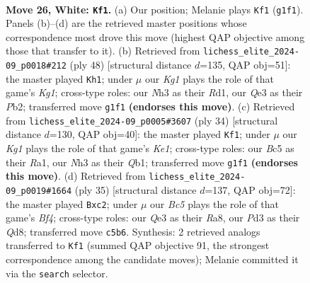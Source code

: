 \documentclass[11pt]{article}
\begin{document}
\clearpage

\begin{figure}[p]\centering
\begin{subfigure}{0.46\textwidth}\centering
\resizebox{\linewidth}{!}{%
\newchessgame
\chessboard[
  setfen={2bqn2r/4bpk1/p5p1/n1BBp2p/P3P3/N2PQ2N/1rP1RPPP/R5K1 w - - 4 26},
  showmover=false,
  pgfstyle=straightmove, color=movearrow, markmove={g1-f1}
]}
\caption{}
\end{subfigure}\hfill
\begin{subfigure}{0.46\textwidth}\centering
\resizebox{\linewidth}{!}{%
\newchessgame
\chessboard[
  setfen={2rq2k1/1p2bpp1/4p1nr/pb1pP2p/7P/P1BP1NQR/1P2NPP1/3R2K1 w - - 0 25},
  showmover=false,
  pgfstyle=straightmove, color=movearrow, markmove={g1-h1}
]}
\caption{}
\end{subfigure}
\\[4pt]
\begin{subfigure}{0.46\textwidth}\centering
\resizebox{\linewidth}{!}{%
\newchessgame
\chessboard[
  setfen={2rqkb2/1b1n1p1p/p3p3/P4p2/1ppP4/4PNB1/1P2BPrP/RQ2K2R w KQ - 0 18},
  showmover=false,
  pgfstyle=straightmove, color=movearrow, markmove={e1-f1}
]}
\caption{}
\end{subfigure}\hfill
\begin{subfigure}{0.46\textwidth}\centering
\resizebox{\linewidth}{!}{%
\newchessgame
\chessboard[
  setfen={r2qr1k1/4npbp/2p3p1/p1npPb2/3N1B2/P1N4P/1PB2PP1/R2QR1K1 b - - 1 18},
  showmover=false,
  pgfstyle=straightmove, color=movearrow, markmove={f5-c2}
]}
\caption{}
\end{subfigure}
\caption{\textbf{Move 26, White: \texttt{Kf1}.} (a) Our position; Melanie plays \texttt{Kf1} (\texttt{g1f1}). Panels (b)--(d) are the retrieved master positions whose correspondence most drove this move (highest QAP objective among those that transfer to it). (b) Retrieved from \texttt{lichess\_elite\_2024-09\_p0018\#212} (ply 48) [structural distance $d$=135, QAP obj=51]: the master played \texttt{Kh1}; under $\mu$ our \emph{Kg1} plays the role of that game's \emph{Kg1}; cross-type roles: our \emph{N}h3 as their \emph{R}d1, our \emph{Q}e3 as their \emph{P}b2; transferred move \texttt{g1f1} \textbf{(endorses this move)}. (c) Retrieved from \texttt{lichess\_elite\_2024-09\_p0005\#3607} (ply 34) [structural distance $d$=130, QAP obj=40]: the master played \texttt{Kf1}; under $\mu$ our \emph{Kg1} plays the role of that game's \emph{Ke1}; cross-type roles: our \emph{B}c5 as their \emph{R}a1, our \emph{N}h3 as their \emph{Q}b1; transferred move \texttt{g1f1} \textbf{(endorses this move)}. (d) Retrieved from \texttt{lichess\_elite\_2024-09\_p0019\#1664} (ply 35) [structural distance $d$=137, QAP obj=72]: the master played \texttt{Bxc2}; under $\mu$ our \emph{Bc5} plays the role of that game's \emph{Bf4}; cross-type roles: our \emph{Q}e3 as their \emph{R}a8, our \emph{P}d3 as their \emph{Q}d8; transferred move \texttt{c5b6}. Synthesis: 2 retrieved analogs transferred to \texttt{Kf1} (summed QAP objective 91, the strongest correspondence among the candidate moves); Melanie committed it via the \texttt{search} selector.}
\label{fig:thought-m50}
\end{figure}
\end{document}
